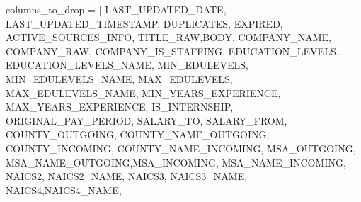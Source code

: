 \documentclass[
  letterpaper,
  DIV=11,
  numbers=noendperiod]{scrartcl}
\newenvironment{Shaded}{\begin{snugshade}}{\end{snugshade}}
\newcommand{\NormalTok}[1]{\textcolor[rgb]{0.00,0.23,0.31}{#1}}
\newcommand{\OperatorTok}[1]{\textcolor[rgb]{0.37,0.37,0.37}{#1}}
\newcommand{\StringTok}[1]{\textcolor[rgb]{0.13,0.47,0.30}{#1}}
\begin{document}
\begin{Shaded}
\begin{Highlighting}[]
\NormalTok{columns\_to\_drop }\OperatorTok{=}\NormalTok{ [}
\StringTok{\textquotesingle{}LAST\_UPDATED\_DATE\textquotesingle{}}\NormalTok{, }\StringTok{\textquotesingle{}LAST\_UPDATED\_TIMESTAMP\textquotesingle{}}\NormalTok{, }\StringTok{\textquotesingle{}DUPLICATES\textquotesingle{}}\NormalTok{, }\StringTok{\textquotesingle{}EXPIRED\textquotesingle{}}\NormalTok{, }\StringTok{\textquotesingle{}ACTIVE\_SOURCES\_INFO\textquotesingle{}}\NormalTok{, }\StringTok{\textquotesingle{}TITLE\_RAW\textquotesingle{}}\NormalTok{,}\StringTok{\textquotesingle{}BODY\textquotesingle{}}\NormalTok{,}
\StringTok{\textquotesingle{}COMPANY\_NAME\textquotesingle{}}\NormalTok{, }\StringTok{\textquotesingle{}COMPANY\_RAW\textquotesingle{}}\NormalTok{, }\StringTok{\textquotesingle{}COMPANY\_IS\_STAFFING\textquotesingle{}}\NormalTok{, }\StringTok{\textquotesingle{}EDUCATION\_LEVELS\textquotesingle{}}\NormalTok{, }\StringTok{\textquotesingle{}EDUCATION\_LEVELS\_NAME\textquotesingle{}}\NormalTok{, }\StringTok{\textquotesingle{}MIN\_EDULEVELS\textquotesingle{}}\NormalTok{,}
\StringTok{\textquotesingle{}MIN\_EDULEVELS\_NAME\textquotesingle{}}\NormalTok{, }\StringTok{\textquotesingle{}MAX\_EDULEVELS\textquotesingle{}}\NormalTok{, }\StringTok{\textquotesingle{}MAX\_EDULEVELS\_NAME\textquotesingle{}}\NormalTok{, }\StringTok{\textquotesingle{}MIN\_YEARS\_EXPERIENCE\textquotesingle{}}\NormalTok{, }\StringTok{\textquotesingle{}MAX\_YEARS\_EXPERIENCE\textquotesingle{}}\NormalTok{, }\StringTok{\textquotesingle{}IS\_INTERNSHIP\textquotesingle{}}\NormalTok{,}
\StringTok{\textquotesingle{}ORIGINAL\_PAY\_PERIOD\textquotesingle{}}\NormalTok{, }\StringTok{\textquotesingle{}SALARY\_TO\textquotesingle{}}\NormalTok{, }\StringTok{\textquotesingle{}SALARY\_FROM\textquotesingle{}}\NormalTok{, }\StringTok{\textquotesingle{}COUNTY\_OUTGOING\textquotesingle{}}\NormalTok{, }\StringTok{\textquotesingle{}COUNTY\_NAME\_OUTGOING\textquotesingle{}}\NormalTok{, }\StringTok{\textquotesingle{}COUNTY\_INCOMING\textquotesingle{}}\NormalTok{, }\StringTok{\textquotesingle{}COUNTY\_NAME\_INCOMING\textquotesingle{}}\NormalTok{,}
\StringTok{\textquotesingle{}MSA\_OUTGOING\textquotesingle{}}\NormalTok{, }\StringTok{\textquotesingle{}MSA\_NAME\_OUTGOING\textquotesingle{}}\NormalTok{,}\StringTok{\textquotesingle{}MSA\_INCOMING\textquotesingle{}}\NormalTok{, }\StringTok{\textquotesingle{}MSA\_NAME\_INCOMING\textquotesingle{}}\NormalTok{, }\StringTok{\textquotesingle{}NAICS2\textquotesingle{}}\NormalTok{, }\StringTok{\textquotesingle{}NAICS2\_NAME\textquotesingle{}}\NormalTok{, }\StringTok{\textquotesingle{}NAICS3\textquotesingle{}}\NormalTok{, }\StringTok{\textquotesingle{}NAICS3\_NAME\textquotesingle{}}\NormalTok{, }\StringTok{\textquotesingle{}NAICS4\textquotesingle{}}\NormalTok{,}\StringTok{\textquotesingle{}NAICS4\_NAME\textquotesingle{}}\NormalTok{,}

\end{Highlighting}
\end{Shaded}
\end{document}
